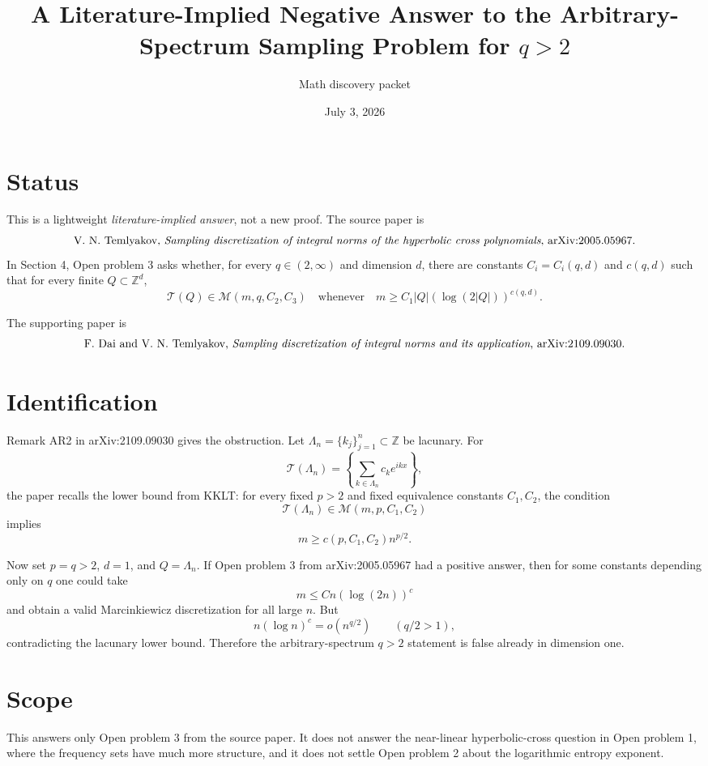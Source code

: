 \documentclass[11pt]{article}
\title{A Literature-Implied Negative Answer to the Arbitrary-Spectrum Sampling Problem for \(q>2\)}
\author{Math discovery packet}
\date{July 3, 2026}
\newcommand{\Tr}{\mathcal T}
\newcommand{\cM}{\mathcal M}
\newcommand{\Z}{\mathbb Z}
\begin{document}
\maketitle

\section{Status}

This is a lightweight \emph{literature-implied answer}, not a new proof.
The source paper is
\[
\text{V. N. Temlyakov, \emph{Sampling discretization of integral norms of the
hyperbolic cross polynomials}, arXiv:2005.05967.}
\]
In Section 4, Open problem 3 asks whether, for every \(q\in(2,\infty)\) and
dimension \(d\), there are constants \(C_i=C_i(q,d)\) and \(c(q,d)\) such
that for every finite \(Q\subset\Z^d\),
\[
  \Tr(Q)\in \cM(m,q,C_2,C_3)
  \quad\text{whenever}\quad
  m\ge C_1 |Q|(\log(2|Q|))^{c(q,d)} .
\]

The supporting paper is
\[
\text{F. Dai and V. N. Temlyakov, \emph{Sampling discretization of integral
norms and its application}, arXiv:2109.09030.}
\]

\section{Identification}

Remark \textup{AR2} in arXiv:2109.09030 gives the obstruction.  Let
\(\Lambda_n=\{k_j\}_{j=1}^n\subset \Z\) be lacunary.  For
\[
  \Tr(\Lambda_n)=\left\{ \sum_{k\in\Lambda_n} c_k e^{ikx} \right\},
\]
the paper recalls the lower bound from KKLT: for every fixed \(p>2\) and
fixed equivalence constants \(C_1,C_2\), the condition
\[
  \Tr(\Lambda_n)\in \cM(m,p,C_1,C_2)
\]
implies
\[
  m\ge c(p,C_1,C_2)n^{p/2}.
\]

Now set \(p=q>2\), \(d=1\), and \(Q=\Lambda_n\).  If Open problem 3 from
arXiv:2005.05967 had a positive answer, then for some constants depending
only on \(q\) one could take
\[
  m \le C n(\log(2n))^{c}
\]
and obtain a valid Marcinkiewicz discretization for all large \(n\).  But
\[
  n(\log n)^c=o(n^{q/2})
  \qquad (q/2>1),
\]
contradicting the lacunary lower bound.  Therefore the arbitrary-spectrum
\(q>2\) statement is false already in dimension one.

\section{Scope}

This answers only Open problem 3 from the source paper.  It does not answer
the near-linear hyperbolic-cross question in Open problem 1, where the
frequency sets have much more structure, and it does not settle Open problem
2 about the logarithmic entropy exponent.
\end{document}
